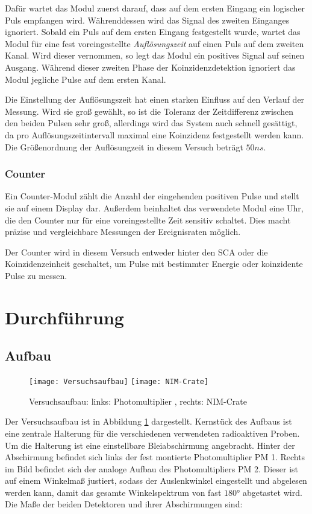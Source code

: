 \documentclass{../Misc/MontavonLaTeX/Montavon}
\newcommand{\halfwidth}{0.48\textwidth}
\begin{document}
Dafür wartet das Modul zuerst darauf, dass auf dem ersten Eingang ein logischer Puls empfangen wird. Währenddessen wird das Signal des zweiten Einganges ignoriert.
Sobald ein Puls auf dem ersten Eingang festgestellt wurde, wartet das Modul für eine fest voreingestellte \emph{Auflösungszeit} auf einen Puls auf dem zweiten Kanal. Wird dieser vernommen, so legt das Modul ein positives Signal auf seinen Ausgang. 
Während dieser zweiten Phase der Koinzidenzdetektion ignoriert das Modul jegliche Pulse auf dem ersten Kanal.

Die Einstellung der Auflösungszeit hat einen starken Einfluss auf den Verlauf der Messung. Wird sie groß gewählt, so ist die Toleranz der Zeitdifferenz zwischen den beiden Pulsen sehr groß, allerdings wird das System auch schnell gesättigt, da pro Auflösungszeitintervall maximal eine Koinzidenz festgestellt werden kann. Die Größenordnung der Auflösungzeit in diesem Versuch beträgt $50 \unit{ns}$.

\subsubsection{Counter}
Ein Counter-Modul zählt die Anzahl der eingehenden positiven Pulse und stellt sie auf einem Display dar. Außerdem beinhaltet das verwendete Modul eine Uhr, die den Counter nur für eine voreingestellte Zeit sensitiv schaltet. Dies macht präzise und vergleichbare Messungen der Ereignisraten möglich.

Der Counter wird in diesem Versuch entweder hinter den SCA oder die Koinzidenzeinheit geschaltet, um Pulse mit bestimmter Energie oder koinzidente Pulse zu messen. 

\section{Durchführung}

\subsection{Aufbau}

\begin{figure}[htbp]
\centering
\texttt{[image: Versuchsaufbau]}
\texttt{[image: NIM-Crate]}
\caption{Versuchsaufbau: links: Photomultiplier , rechts: NIM-Crate}
\label{fig:Aufbau}
\end{figure}

Der Versuchsaufbau ist in Abbildung \ref{fig:Aufbau} dargestellt. Kernstück des Aufbaus ist eine zentrale Halterung für die verschiedenen verwendeten radioaktiven Proben. Um die Halterung ist eine einstellbare Bleiabschirmung angebracht. Hinter der Abschirmung befindet sich links der fest montierte Photomultiplier PM 1. Rechts im Bild befindet sich der analoge Aufbau des Photomultipliers PM 2. Dieser ist auf einem Winkelmaß justiert, sodass der Auslenkwinkel eingestellt und abgelesen werden kann, damit das gesamte Winkelspektrum von fast $180 \unit{\degree}$ abgetastet wird. Die Maße der beiden Detektoren und ihrer Abschirmungen sind:
\end{document}
